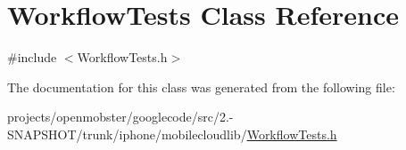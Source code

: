 \hypertarget{interface_workflow_tests}{
\section{\-Workflow\-Tests \-Class \-Reference}
\label{interface_workflow_tests}
}


{\ttfamily \#include $<$\-Workflow\-Tests.\-h$>$}



\-The documentation for this class was generated from the following file\-:\begin{DoxyCompactItemize}
\item 
projects/openmobster/googlecode/src/2.-\/\-S\-N\-A\-P\-S\-H\-O\-T/trunk/iphone/mobilecloudlib/\hyperlink{_workflow_tests_8h}{\-Workflow\-Tests.\-h}\end{DoxyCompactItemize}
